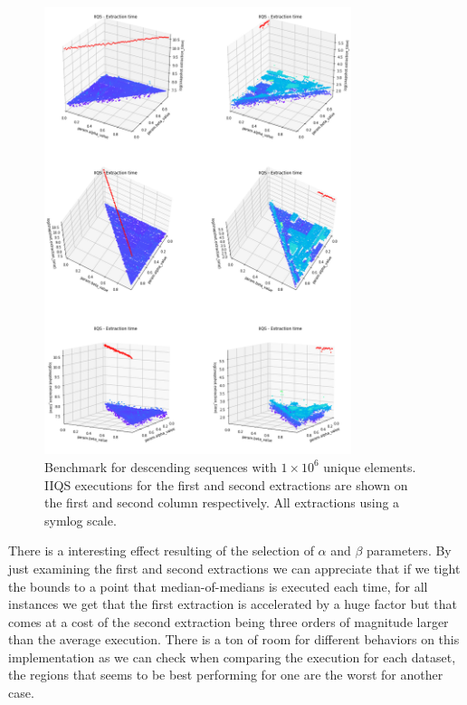 \begin{figure}[p]
    \centering
    \includegraphics[width=0.8\textwidth]{./fragments/04_experimental_execution/images/04_alphabeta_singleclass_desc.png}
    \caption{Benchmark for descending sequences with $1\times10^6$ unique elements. IIQS executions for the first and second extractions are shown on the first and second column respectively. All extractions using a symlog scale.}
    \label{FIG:05_ALPHABETA_RELATIONSHIP_DESC}
\end{figure}


There is a interesting effect resulting of the selection of $\alpha$ and $\beta$ parameters. By just examining the first and second extractions we can appreciate that if we tight the bounds to a point that median-of-medians is executed each time, for all instances we get that the first extraction is accelerated by a huge factor but that comes at a cost of the second extraction being three orders of magnitude larger than the average execution. There is a ton of room for different behaviors on this implementation as we can check when comparing the execution for each dataset, the regions that seems to be best performing for one are the worst for another case.

